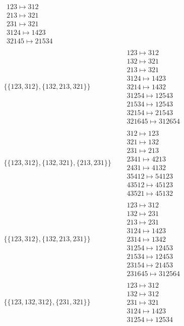 \begin{tiny}
\begin{align}
\begin{matrix}
123 \mapsto 312\\213 \mapsto 321\\231 \mapsto 321\\3124 \mapsto 1423\\32145 \mapsto 21534
\end{matrix}
\\
\{\{123, 312\}, \{132, 213, 321\}\}
\quad
&
\begin{matrix}
123 \mapsto 312\\132 \mapsto 321\\213 \mapsto 321\\3124 \mapsto 1423\\3214 \mapsto 1432\\31254 \mapsto 12543\\21534 \mapsto 12543\\32154 \mapsto 21543\\321645 \mapsto 312654
\end{matrix}
\\
\{\{123, 312\}, \{132, 321\}, \{213, 231\}\}
\quad
&
\begin{matrix}
312 \mapsto 123\\321 \mapsto 132\\231 \mapsto 213\\2341 \mapsto 4213\\2431 \mapsto 4132\\35412 \mapsto 54123\\43512 \mapsto 45123\\43521 \mapsto 45132
\end{matrix}
\\
\{\{123, 312\}, \{132, 213, 231\}\}
\quad
&
\begin{matrix}
123 \mapsto 312\\132 \mapsto 231\\213 \mapsto 231\\3124 \mapsto 1423\\2314 \mapsto 1342\\31254 \mapsto 12453\\21534 \mapsto 12453\\23154 \mapsto 21453\\231645 \mapsto 312564
\end{matrix}
\\
\{\{123, 132, 312\}, \{231, 321\}\}
\quad
&
\begin{matrix}
123 \mapsto 312\\132 \mapsto 312\\231 \mapsto 321\\3124 \mapsto 1423\\31254 \mapsto 12534

\end{matrix}
\end{align}
\end{tiny}
